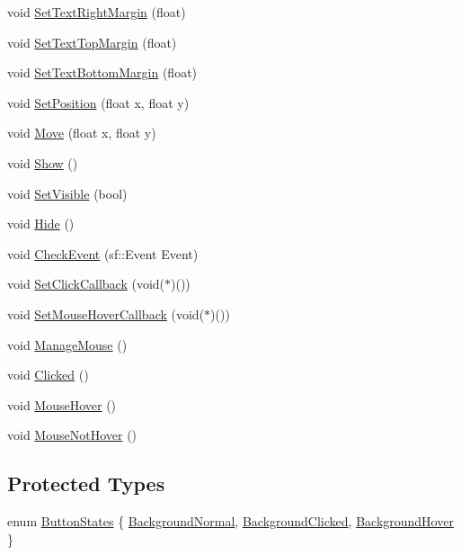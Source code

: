 \begin{CompactItemize}
void \hyperlink{classsfgui_1_1Object_dcea61673771a680fc47e4b838c2a59e}{SetTextRightMargin} (float)
\item 
void \hyperlink{classsfgui_1_1Object_6c3eb411a957d05707d858ded4cd951c}{SetTextTopMargin} (float)
\item 
void \hyperlink{classsfgui_1_1Object_db61eb19249fbbd28462cc79ca17b738}{SetTextBottomMargin} (float)
\item 
void \hyperlink{classsfgui_1_1Object_664c57bd35504a7d00963980d68dd022}{SetPosition} (float x, float y)
\item 
void \hyperlink{classsfgui_1_1Object_70b15fba99da515808d3da7d8042f458}{Move} (float x, float y)
\item 
void \hyperlink{classsfgui_1_1Object_cdf7f9b5f731e49e0e13e55de704805d}{Show} ()
\item 
void \hyperlink{classsfgui_1_1Object_c5d4f50f3d8712f098915cee5fc4ad41}{SetVisible} (bool)
\item 
void \hyperlink{classsfgui_1_1Object_e4711d5359ca3b756c9d4e063890cf16}{Hide} ()
\item 
void \hyperlink{classsfgui_1_1Object_cd9dbf2abe79e04c22f281bccb8bdb0e}{CheckEvent} (sf::Event Event)
\item 
void \hyperlink{classsfgui_1_1Object_d3d20a4cccde599748db724236ca0826}{SetClickCallback} (void($\ast$)())
\item 
void \hyperlink{classsfgui_1_1Object_8317dbdf44797dd69de490d4b946ed83}{SetMouseHoverCallback} (void($\ast$)())
\item 
void \hyperlink{classsfgui_1_1Object_3332575d988f9eee589f57b2ad516593}{ManageMouse} ()
\item 
void \hyperlink{classsfgui_1_1Object_da7f84701d318ce93fe59cc2f571eaf2}{Clicked} ()
\item 
void \hyperlink{classsfgui_1_1Object_68d1941ad05b3d0bdf2ba85702c04cc0}{MouseHover} ()
\item 
void \hyperlink{classsfgui_1_1Object_24575661efb4ab88be76eb2e1a4947e6}{MouseNotHover} ()
\end{CompactItemize}
\subsection*{Protected Types}
\begin{CompactItemize}
\item 
enum \hyperlink{classsfgui_1_1Object_8a7d7ae20a88b7ef8a104f7e6c8596ce}{ButtonStates} \{ \hyperlink{classsfgui_1_1Object_8a7d7ae20a88b7ef8a104f7e6c8596cee8211d79a1f35d08db2b31a914bddc38}{BackgroundNormal}, 
\hyperlink{classsfgui_1_1Object_8a7d7ae20a88b7ef8a104f7e6c8596ce03b529b6f0fee7ab7cc0033441180b67}{BackgroundClicked}, 
\hyperlink{classsfgui_1_1Object_8a7d7ae20a88b7ef8a104f7e6c8596ce9befc9dbae9107e3e7546af33a139df9}{BackgroundHover}
 \}
\end{CompactItemize}
